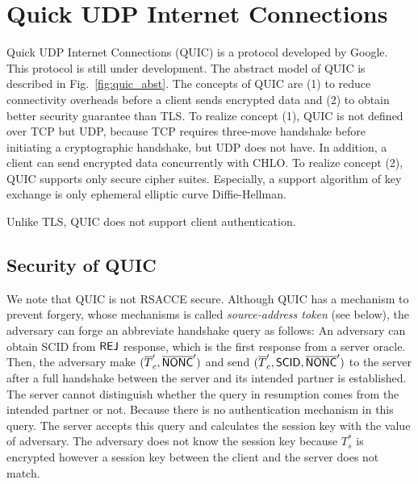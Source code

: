\section{Quick UDP Internet Connections} \label{sec:quic}

Quick UDP Internet Connections (QUIC) is a protocol
developed by Google. This protocol is still under
development.
The abstract model of QUIC is described in
Fig.~\ref{fig:quic_abst}.
The concepts of QUIC are (1) to reduce connectivity
overheads before a client sends encrypted data and
(2) to obtain better security guarantee than TLS.
To realize concept (1), QUIC is not defined over
TCP but UDP, because TCP requires three-move handshake
before initiating a cryptographic handshake, but UDP
does not have. In addition, a client can send encrypted
data concurrently with CHLO.
To realize concept (2), QUIC supports only secure cipher
suites.
Especially, a support algorithm of key exchange is only
ephemeral elliptic curve Diffie-Hellman.

Unlike TLS, QUIC does not support client authentication.

\subsection{Security of QUIC} \label{sec:quic_detail}




We note that QUIC is not RSACCE secure.
Although QUIC has a mechanism to prevent forgery,
whose mechanisms is called \textit{source-address token}
(see below), the adversary can forge an abbreviate handshake
query as follows: An adversary can obtain SCID from $\mathsf{REJ}$
response, which is the first response from a server oracle.
Then, the adversary make $(\overline{T}_c^{\prime},
\overline{\mathsf{NONC}}^{\prime})$ and send $(\overline{T}_c^{\prime},
\mathsf{SCID}, \overline{\mathsf{NONC}}^{\prime})$ to the server after a
full handshake between the server and its intended partner
is established.
The server cannot distinguish whether the query in resumption
comes from the intended partner or not. Because there is no
authentication mechanism in this query. The server accepts
this query and calculates the session key with the value
of adversary.
The adversary does not know the session key because
$T_s^{\ast}$ is encrypted however a session key between the
client and the server does not match.

